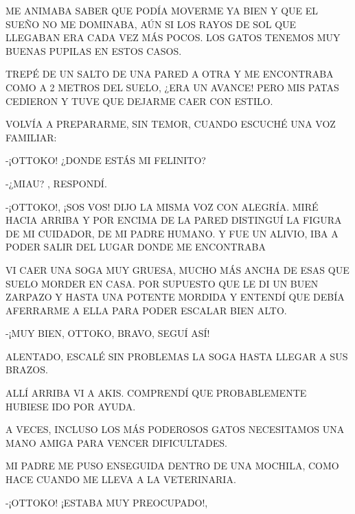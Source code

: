 ME ANIMABA SABER QUE PODÍA MOVERME YA BIEN Y QUE EL SUEÑO NO ME DOMINABA, AÚN SI LOS RAYOS DE SOL QUE LLEGABAN ERA CADA VEZ MÁS POCOS. LOS GATOS TENEMOS MUY BUENAS PUPILAS EN ESTOS CASOS. 

TREPÉ DE UN SALTO DE UNA PARED A OTRA Y ME ENCONTRABA COMO A 2 METROS DEL SUELO, ¿ERA UN AVANCE! PERO MIS PATAS CEDIERON Y TUVE QUE DEJARME CAER CON ESTILO.

VOLVÍA A PREPARARME, SIN TEMOR, CUANDO ESCUCHÉ UNA VOZ FAMILIAR:

-¡OTTOKO! ¿DONDE ESTÁS MI FELINITO?




\newpage
{}	
-¿MIAU?	, RESPONDÍ.

-¡OTTOKO!, ¡SOS VOS! DIJO LA MISMA VOZ CON ALEGRÍA. MIRÉ HACIA ARRIBA Y POR ENCIMA DE LA PARED DISTINGUÍ LA FIGURA DE MI CUIDADOR, DE MI PADRE HUMANO. Y FUE UN ALIVIO, IBA A PODER SALIR DEL LUGAR DONDE ME ENCONTRABA

VI CAER UNA SOGA MUY GRUESA, MUCHO MÁS ANCHA DE ESAS QUE SUELO MORDER EN CASA. POR SUPUESTO QUE LE DI UN BUEN ZARPAZO Y HASTA UNA POTENTE MORDIDA Y ENTENDÍ QUE DEBÍA AFERRARME A ELLA PARA PODER ESCALAR BIEN ALTO.

-¡MUY BIEN, OTTOKO, BRAVO, SEGUÍ ASÍ!

ALENTADO, ESCALÉ SIN PROBLEMAS LA SOGA HASTA LLEGAR A SUS BRAZOS.

ALLÍ ARRIBA  VI A AKIS. COMPRENDÍ QUE PROBABLEMENTE HUBIESE IDO POR AYUDA. 




\newpage
{}	
A VECES, INCLUSO LOS MÁS PODEROSOS GATOS NECESITAMOS UNA MANO AMIGA PARA VENCER DIFICULTADES.

MI PADRE ME PUSO ENSEGUIDA DENTRO DE UNA MOCHILA, COMO  HACE CUANDO ME LLEVA A LA VETERINARIA. 

-¡OTTOKO! ¡ESTABA MUY PREOCUPADO!,

